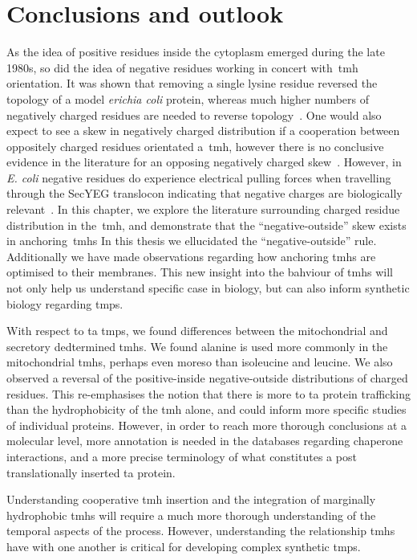 \chapter{Conclusions and outlook}
\sloppy
As the idea of positive residues inside the cytoplasm emerged during the late 1980s, so did the idea of negative residues working in concert with~\gls{tmh} orientation.
It was shown that removing a single lysine residue reversed the topology of a model \textit{erichia coli} protein, whereas much higher numbers of negatively charged residues are needed to reverse topology~\cite{Nilsson1990}.
One would also expect to see a skew in negatively charged distribution if a cooperation between oppositely charged residues orientated a~\gls{tmh}, however there is no conclusive evidence in the literature for an opposing negatively charged skew~\cite{Granseth2005, Nilsson2005a, Sharpe2010, Baeza-Delgado2013, Pogozheva2013}.
However, in \textit{E.
coli} negative residues do experience electrical pulling forces when travelling through the SecYEG translocon indicating that negative charges are biologically relevant~\cite{Ismail2015}.
In this chapter, we explore the literature surrounding charged residue distribution in the~\gls{tmh}, and demonstrate that the ``negative-outside'' skew exists in anchoring~\gls{tmh}s
In this thesis we ellucidated the ``negative\--outside'' rule.
Additionally we have made observations regarding how anchoring \gls{tmh}s are optimised to their membranes.
This new insight into the bahviour of \gls{tmh}s will not only help us understand specific case in biology, but can also inform synthetic biology regarding \gls{tmp}s.

With respect to \gls{ta} \gls{tmp}s, we found differences between the mitochondrial and secretory dedtermined \gls{tmh}s.
We found alanine is used more commonly in the mitochondrial \gls{tmh}s, perhaps even moreso than isoleucine and leucine.
We also observed a reversal of the positive\--inside negative\--outside distributions of charged residues.
This re\--emphasises the notion that there is more to \gls{ta} protein trafficking than the hydrophobicity of the \gls{tmh} alone, and could inform more specific studies of individual proteins.
However, in order to reach more thorough conclusions at a molecular level, more annotation is needed in the databases regarding chaperone interactions, and a more precise terminology of what constitutes a post translationally inserted \gls{ta} protein.

Understanding cooperative \gls{tmh} insertion and the integration of marginally hydrophobic \gls{tmh}s will require a much more thorough understanding of the temporal aspects of the process. %
However, understanding the relationship \gls{tmh}s have with one another is critical for developing complex synthetic \gls{tmp}s.
